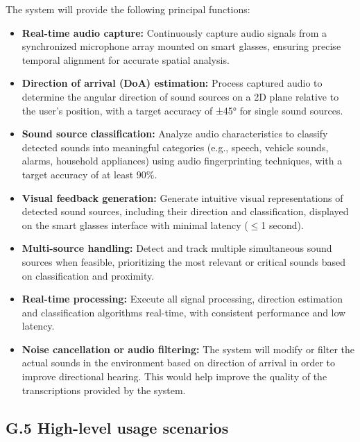 \documentclass[12pt]{article}
\theoremstyle{definition}
\begin{document}
The system will provide the following principal functions:

\begin{itemize}
\item \textbf{Real-time audio capture:} Continuously capture audio signals
from a synchronized microphone array mounted on smart glasses, ensuring
precise temporal alignment for accurate spatial analysis.

\item \textbf{Direction of arrival (DoA) estimation:} Process captured audio
to determine the angular direction of sound sources on a 2D plane relative
to the user's position, with a target accuracy of ±45° for single sound
sources.

\item \textbf{Sound source classification:} Analyze audio characteristics to
classify detected sounds into meaningful categories (e.g., speech, vehicle
sounds, alarms, household appliances) using audio fingerprinting techniques,
with a target accuracy of at least 90\%.

\item \textbf{Visual feedback generation:} Generate intuitive visual
representations of detected sound sources, including their direction and
classification, displayed on the smart glasses interface with minimal
latency ($\leq$1 second).

\item \textbf{Multi-source handling:} Detect and track multiple simultaneous
sound sources when feasible, prioritizing the most relevant or critical
sounds based on classification and proximity.

\item \textbf{Real-time processing:} Execute all signal processing,
direction estimation and classification algorithms real-time,
with consistent performance and low latency.

\item \textbf{Noise cancellation or audio filtering:} The system will
modify or filter the actual sounds in the environment based on direction
of arrival in order to improve directional hearing. This would help improve
the quality of the transcriptions provided by the system.
\end{itemize}

\subsection{G.5 High-level usage scenarios} \label{item: G.5}
\end{document}
